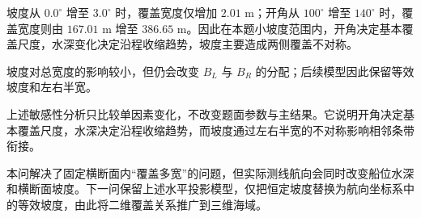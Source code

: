 坡度从 $0.0^\circ$ 增至 $3.0^\circ$ 时，覆盖宽度仅增加 $2.01\text{ m}$；开角从 $100^\circ$ 增至 $140^\circ$ 时，覆盖宽度则由 $167.01\text{ m}$ 增至 $386.65\text{ m}$。因此在本题小坡度范围内，开角决定基本覆盖尺度，水深变化决定沿程收缩趋势，坡度主要造成两侧覆盖不对称。

坡度对总宽度的影响较小，但仍会改变 $B_L$ 与 $B_R$ 的分配；后续模型因此保留等效坡度和左右半宽。

上述敏感性分析只比较单因素变化，不改变题面参数与主结果。它说明开角决定基本覆盖尺度，水深决定沿程收缩趋势，而坡度通过左右半宽的不对称影响相邻条带衔接。

本问解决了固定横断面内“覆盖多宽”的问题，但实际测线航向会同时改变船位水深和横断面坡度。下一问保留上述水平投影模型，仅把恒定坡度替换为航向坐标系中的等效坡度，由此将二维覆盖关系推广到三维海域。
